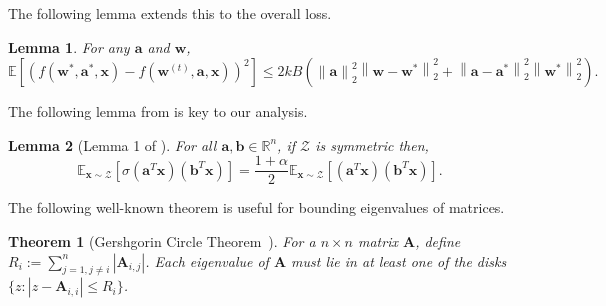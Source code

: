\documentclass[11pt]{article}
\newcommand{\E}{\mathbb{E}}
\newcommand{\mat}[1]{\mathbf{#1}}
\newcommand{\vect}[1]{\mathbf{#1}}
\newcommand{\norm}[1]{\left\|#1\right\|}
\newcommand{\inputdist}{\mathcal{Z}}
\newtheorem{thm}{Theorem}[section]
\newtheorem{lem}{Lemma}[section]
\begin{document}
The following lemma extends this to the overall loss.
\begin{lem}\label{lem:loss}
For any $\vect{a}$ and $\vect{w}$,
\[
\E[\left(f\left(\vect{w}^*, \vect{a}^*, \vect{x}\right) - f\left(\vect{w}^{\left(t\right)}, \vect{a}, \vect{x}\right)\right)^2] \leq 2k B\left(\norm{\vect{a}}_2^2\norm{\vect{w} - \vect{w}^*}_2^2 + \norm{\vect{a} - \vect{a}^*}_2^2\norm{\vect{w}^*}_2^2\right).
\]
\end{lem}

The following lemma from \cite{goel2018learning} is key to our analysis.
\begin{lem}[Lemma 1 of \cite{goel2018learning}]\label{lem:switch}
For all $\vect{a},\vect{b} \in \mathbb{R}^n$, if $\inputdist$ is symmetric then,
\[
\E_{\vect{x} \sim \inputdist}[\sigma\left(\vect{a}^T  \vect{x}\right)\left(\vect{b}^T  \vect{x}\right)] = \frac{1 + \alpha}{2}\E_{\vect{x} \sim \inputdist}[\left(\vect{a}^T  \vect{x}\right)\left(\vect{b}^T  \vect{x}\right)].
\]
\end{lem}

The following well-known theorem is useful for bounding eigenvalues of matrices.
\begin{thm}[Gershgorin Circle Theorem~\cite{weisstein2003gershgorin}]\label{thm:circle}
For a $n \times n$ matrix $\mat{A}$, define $R_i:= \sum_{j = 1, j \neq i}^n |\mat{A}_{i,j}|$. Each eigenvalue of $\mat{A}$ must lie in at least one of the disks $\{z: |z - \mat{A}_{i,i}| \leq R_i\}$.
\end{thm}
\end{document}
